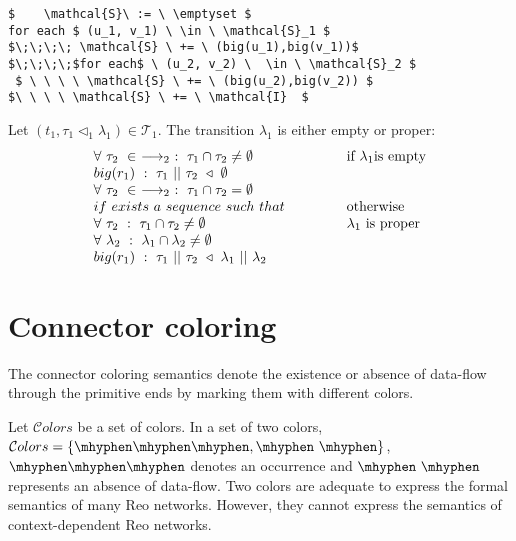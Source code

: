 \begin{lstlisting}[frame=single,caption=Calculating seepage relation $\mathcal{S}$,label=arr:calcSS,mathescape]
$    \mathcal{S}\ := \ \emptyset $
for each $ (u_1, v_1) \ \in \ \mathcal{S}_1 $
$\;\;\;\; \mathcal{S} \ += \ (big(u_1),big(v_1))$
$\;\;\;\;$for each$ \ (u_2, v_2) \  \in \ \mathcal{S}_2 $
 $ \ \ \ \ \mathcal{S} \ += \ (big(u_2),big(v_2)) $
$\ \ \ \ \mathcal{S} \ += \ \mathcal{I}  $
\end{lstlisting}

Let $(t_1, \mathcal{\tau}_1 \triangleleft_1 \mathcal{\lambda}_1) \in \mathcal{T}_1$. The transition $\lambda_1$ is either empty or proper:
\begin{equation}
 \begin{array}{ll}
			\forall \ \tau_2 \ \in \ \longrightarrow_2 \ : \ \tau_1 \cap \tau_2 \neq \emptyset \hspace*{2cm} & \mbox{if $\lambda_1 $is empty} \\
			big(r_1) \ : \ \tau_1 \ || \ \tau_2 \ \triangleleft \ \emptyset  &  \\
			\forall \ \tau_2 \ \in \ \longrightarrow_2 \ : \ \tau_1 \cap \tau_2 = \emptyset & \\
			if \ exists \ a \ sequence \ such \ that  & \mbox{otherwise } \\
			\forall \ \tau_2 \ : \ \tau_1 \cap \tau_2 \neq \emptyset & \mbox{$\lambda_1$ is proper } \\
			\forall \ \lambda_2 \ : \ \lambda_1 \cap \lambda_2 \neq \emptyset & \\
			big(r_1) \ : \ \tau_1 \ || \ \tau_2 \ \triangleleft \ \lambda_1 \ || \ \lambda_2  &  
		\end{array}
\label{arr:calcS}
\end{equation}

\section{Connector coloring}
\label{sec:cc}
The connector coloring semantics \cite{coloring} denote the existence or absence of data-flow through the primitive ends by marking them with different colors. 

Let $\mathcal{C}olors$ be a set of colors. In a set of two colors, $\mathcal{C}olors = \{\flowdoc, \noflowdoc\}$, $\flowdoc$ denotes an occurrence and $\noflowdoc$ represents an absence of data-flow. Two colors are adequate to express the formal semantics of many Reo networks. However, they cannot express the semantics of context-dependent Reo networks.

